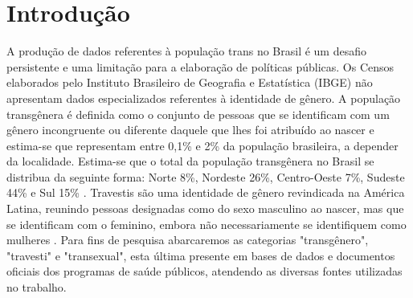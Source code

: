 \documentclass[12pt]{article}
\begin{document}
\section{Introdução}
\label{sec:introducao}

A produção de dados referentes à população trans no Brasil é um desafio persistente e uma limitação para a elaboração de políticas públicas. Os Censos elaborados pelo Instituto Brasileiro de Geografia e Estatística (IBGE) não apresentam dados especializados referentes à identidade de gênero. A população transgênera é definida como o conjunto de pessoas que se identificam com um gênero incongruente ou diferente daquele que lhes foi atribuído ao nascer e estima-se que representam entre 0,1\% e 2\% da população brasileira, a depender da localidade. Estima-se que o total da população transgênera no Brasil se distribua da seguinte forma: Norte 8\%, Nordeste 26\%, Centro-Oeste 7\%, Sudeste 44\% e Sul 15\% \cite{spizziri_eufrasio_lima:2021}. Travestis  são uma identidade de gênero revindicada na América Latina, reunindo pessoas designadas como do sexo masculino ao nascer, mas que se identificam com o feminino, embora não necessariamente se identifiquem como mulheres \cite{leal_silva_lizzi:2026}. Para fins de pesquisa abarcaremos as categorias "transgênero", "travesti" e "transexual", esta última presente em bases de dados e documentos oficiais dos programas de saúde públicos, atendendo as diversas fontes utilizadas no trabalho.
\end{document}
